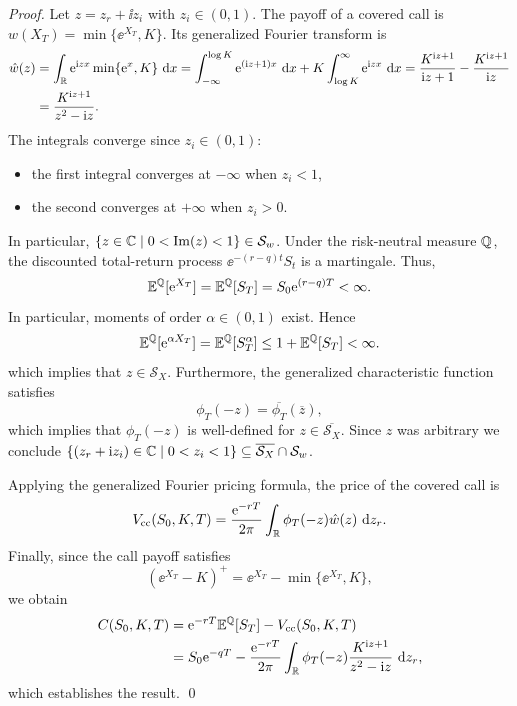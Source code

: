 \begin{proof}
  Let $z=z_r+\ii z_i$ with $z_i\in(0,1)$. The payoff of a covered call is
  $w(X_T)=\min\{\ee^{X_T},K\}$. Its generalized Fourier transform is
  \begin{align*}
    \hat{w}(z)
    &= \int_{\mathbb{R}}\text{e}^{\text{i} zx}\min\{\text{e}^x,K\}\text{ d} x
    = \int_{-\infty}^{\log K}\text{e}^{(\text{i} z+1)x}\text{ d} x
       +K\int_{\log K}^{\infty}\text{e}^{\text{i} zx}\text{ d} x
    = \frac{K^{\text{i} z+1}}{\text{i} z+1} -\frac{K^{\text{i} z+1}}{\text{i} z}\\
    &= \frac{K^{\text{i} z+1}}{z^2-\text{i} z}.
  \end{align*}
  The integrals converge since $z_i\in(0,1)$:
  \begin{itemize}
  \item the first integral converges at $-\infty$ when $z_i<1$, 
  \item the second converges at $+\infty$ when $z_i>0$.
  \end{itemize}
  In particular, $\{ z \in \mathbb{C}\mid  0 < \operatorname{Im}(z)< 1 \}\in \mathcal{S}_w$. Under the risk-neutral
  measure $\mathbb{Q}$, the discounted total-return process $\ee^{-(r-q)t}S_t$ is a martingale. Thus,
  \[
    \mathbb{E}^{\mathbb{Q}}[\text{e}^{X_T}]=\mathbb{E}^{\mathbb{Q}}[S_T]
    = S_0\text{e}^{(r-q)T}<\infty.
  \]
  In particular, moments of order $\alpha\in(0,1)$ exist. Hence
  \[
    \mathbb{E}^{\mathbb{Q}}[\text{e}^{\alpha X_T}]
    =\mathbb{E}^{\mathbb{Q}}[S_T^\alpha]
    \leq 1+\mathbb{E}^{\mathbb{Q}}[S_T]<\infty.
  \]
  which implies that $z \in \mathcal{S}_X.$ Furthermore, the generalized characteristic function
  satisfies
  \[
  \phi_T(-z)=\overline{\phi_T}(\overline{z}),
  \]
  which implies that $\phi_T(-z)$ is well-defined for
  $z\in\overline{\mathcal{S}_X}$.  Since $z$ was arbitrary we conclude $\{ (z_r + \text{i} z_i) \in \mathbb{C}
  \mid  0 < z_i < 1\} \subseteq \overline{\mathcal{S}_X} \cap  \mathcal{S}_w$. 

  Applying the generalized Fourier pricing formula, the price
  of the covered call is
  \[
    V_{\mathrm{cc}}(S_0,K,T)
    =\frac{\text{e}^{-rT}}{2\pi}
    \int_{\mathbb{R}}\phi_T(-z)\hat{w}(z)\text{ d} z_r.
  \]
  Finally, since the call payoff satisfies
  \[
    (\ee^{X_T}-K)^+
    =\ee^{X_T}-\min\{\ee^{X_T},K\},
  \]
  we obtain
  \[
    \begin{aligned}
      C(S_0,K,T)
      &=\text{e}^{-rT}\mathbb{E}^{\mathbb{Q}}[S_T]
        -V_{\mathrm{cc}}(S_0,K,T)\\
      &=S_0\text{e}^{-qT}
        -\frac{\text{e}^{-rT}}{2\pi}
        \int_{\mathbb{R}}\phi_T(-z)
        \frac{K^{\text{i} z+1}}{z^2-\text{i} z}\text{ d} z_r,
    \end{aligned}
  \]
  which establishes the result.
  \qed
\end{proof}
